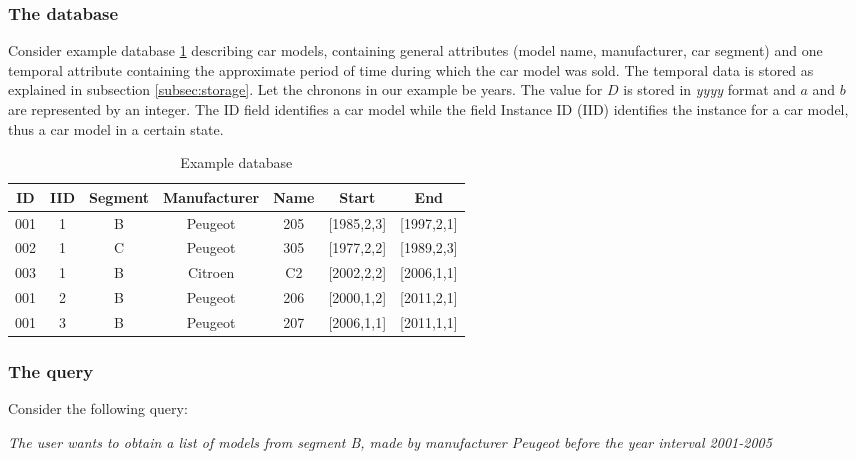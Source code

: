 \subsubsection{The database}
Consider example database \ref{tb:car-models} describing car models, containing general attributes (model name, manufacturer, car segment) and one temporal attribute containing the approximate period of time during which the car model was sold. The temporal data is stored as explained in subsection \ref{subsec:storage}. Let the chronons in our example be years. The value for $D$ is stored in \emph{yyyy} format and $a$ and $b$ are represented by an integer. The ID field identifies a car model while the field Instance ID (IID) identifies the instance for a car model, thus a car model in a certain state.
\begin{table}[h]
\centering
\begin{tabular}{c c c c c c c}
\hline
ID & IID & Segment & Manufacturer & Name & Start & End  \\ [0.5ex]
\hline
001 & 1 & B & Peugeot & 205 & [1985,2,3] & [1997,2,1] \\
002 & 1 & C & Peugeot & 305 & [1977,2,2] & [1989,2,3] \\
003 & 1 & B & Citroen & C2 & [2002,2,2] & [2006,1,1] \\
001 & 2 & B & Peugeot & 206 & [2000,1,2] & [2011,2,1] \\
001 & 3 & B & Peugeot & 207 & [2006,1,1] & [2011,1,1]\\
\hline
\end{tabular}
\vspace{10pt}
\caption{Example database}
\label{tb:car-models}

\vspace{-30pt}

\end{table}

\subsubsection{The query}
Consider the following query:

\begin{center}
\emph{The user wants to obtain a list of models from segment B, made by manufacturer Peugeot before the year interval 2001-2005}
\end{center}

